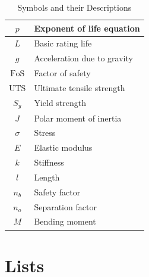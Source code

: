 \documentclass[12pt]{report}
\begin{document}
\begin{table}[H]
\begin{tabular}{|c|l|}
$p$             & Exponent of life equation \\ \hline
$L$             & Basic rating life         \\ \hline
$g$             & Acceleration due to gravity \\ \hline
$\text{FoS}$    & Factor of safety          \\ \hline
$\text{UTS}$    & Ultimate tensile strength \\ \hline
$S_y$           & Yield strength            \\ \hline
$J$             & Polar moment of inertia   \\ \hline
$\sigma$        & Stress                    \\ \hline
$E$             & Elastic modulus           \\ \hline
$k$             & Stiffness                 \\ \hline
$l$             & Length                    \\ \hline
$n_b$           & Safety factor             \\ \hline
$n_o$           & Separation factor         \\ \hline
$M$             & Bending moment            \\ \hline
\end{tabular}
\caption{Symbols and their Descriptions}
\label{tab:symbols}
\end{table}
\section*{Lists}
\end{document}

